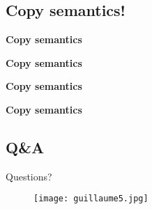 \subsection*{Copy semantics!}
\begin{frame}\textbf{{Copy semantics}}
    
\end{frame}
\begin{frame}\textbf{{Copy semantics}}
    
\end{frame}
\begin{frame}\textbf{{Copy semantics}}
    
\end{frame}
\begin{frame}\textbf{{Copy semantics}}
    
\end{frame}

\subsection*{Q\&A}
\begin{frame}{Questions?}
    \begin{figure}
        \centering
        \texttt{[image: guillaume5.jpg]}
    \end{figure}
\end{frame}